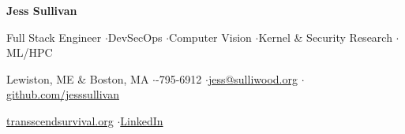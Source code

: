 \documentclass[10pt,letterpaper]{article}
\begin{document}
\begin{center}
    
    \vspace{0.4em}
    
    {\Huge\bfseries\sffamily\color{primary} Jess Sullivan}
    
    \vspace{0.4em}
    
    {\color{muted} Full Stack Engineer \quad$\cdot$\quad DevSecOps \quad$\cdot$\quad Computer Vision \quad$\cdot$\quad Kernel \& Security Research \quad$\cdot$\quad ML/HPC}
    
    \vspace{0.4em}
    
    {\small\color{secondary} Lewiston, ME \& Boston, MA \quad$\cdot$-795-6912 \quad$\cdot$\quad \href{mailto:jess@sulliwood.org}{jess@sulliwood.org} \quad$\cdot$\quad \href{https://github.com/jesssullivan}{github.com/jesssullivan}}
    
    \vspace{0.2em}
    
    {\small\color{secondary} \href{https://transscendsurvival.org}{transscendsurvival.org} \quad$\cdot$\quad \href{https://www.linkedin.com/in/jess-sullivan-11032a367/}{LinkedIn}}
    
    \vspace{0.4em}
\end{center}

\vspace{0.3em}
\end{document}
